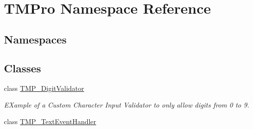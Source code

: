 \hypertarget{namespace_t_m_pro}{}\section{T\+M\+Pro Namespace Reference}
\label{namespace_t_m_pro}
\subsection*{Namespaces}
\begin{DoxyCompactItemize}
\end{DoxyCompactItemize}
\subsection*{Classes}
\begin{DoxyCompactItemize}
\item 
class \hyperlink{class_t_m_pro_1_1_t_m_p___digit_validator}{T\+M\+P\+\_\+\+Digit\+Validator}
\begin{DoxyCompactList}\small\item\em E\+Xample of a Custom Character Input Validator to only allow digits from 0 to 9. \end{DoxyCompactList}\item 
class \hyperlink{class_t_m_pro_1_1_t_m_p___text_event_handler}{T\+M\+P\+\_\+\+Text\+Event\+Handler}
\end{DoxyCompactItemize}
